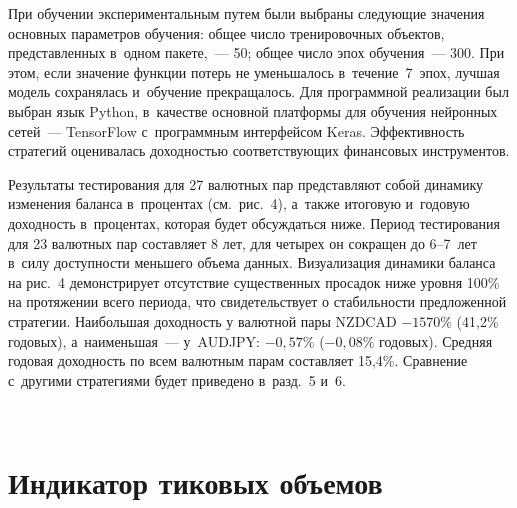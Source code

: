 {\begin{multicols}{2}
При обуче\-нии экспериментальным путем были выбраны 
сле\-ду\-ющие значения основных па\-ра\-мет\-ров обуче\-ния: общее чис\-ло тренировочных объектов, 
пред\-став\-лен\-ных в~одном пакете,~--- 50; общее чис\-ло эпох обуче\-ния~--- 300. При этом, если 
значение функции потерь не уменьшалось в~течение~7~эпох, лучшая модель сохранялась 
и~обуче\-ние прекращалось. Для программной реализации был выбран язык Python, в~качестве 
основной платформы для обучения нейронных сетей~--- TensorFlow с~программным 
интерфейсом Keras. Эффективность стратегий оценивалась до\-ход\-ностью со\-от\-вет\-ст\-ву\-ющих 
финансовых инструментов.
  
  Результаты тестирования для 27 валютных пар представляют собой динамику изменения 
баланса в~процентах (см.\ рис.~4), а~также итоговую и~годовую доходность в~процентах, 
которая будет обсуждаться ниже. Период тестирования для 23 валютных пар составляет 8 
лет, для четырех он сокращен до 6--7~лет в~силу доступности меньшего объема данных. 
Визуализация динамики баланса на рис.~4 демонстрирует отсутствие существенных 
просадок ниже уровня 100\% на протяжении всего периода, что свидетельствует о 
стабильности предложенной стратегии. Наибольшая доходность у валютной пары NZDCAD 
$- 1570\%$ (41,2\% годовых), а~наименьшая~--- у~AUDJPY: $-0{,}57\%$ ($-0{,}08\%$ годовых). 
Средняя годовая доходность по всем валютным парам со\-став\-ля\-ет 15,4\%. Сравнение с~другими стратегиями будет приведено в~разд.~5 и~6. 

\begin{figure*}[b] %
\vspace*{6pt}
  \begin{center}  
    \mbox{%
\epsfxsize=140.628mm
}

\end{center}
\vspace*{-6pt}
\end{figure*}

\vspace*{-6pt}
  
\section{Индикатор тиковых объемов}

\vspace*{-2pt}


\end{multicols}}
